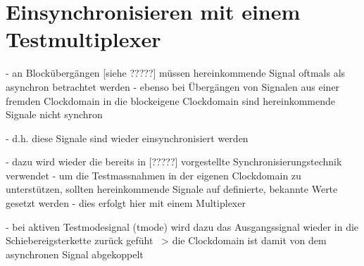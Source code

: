\section{Einsynchronisieren mit einem Testmultiplexer} \label{part-3:SIWTM}

- an Blockübergängen [siehe ?????] müssen hereinkommende Signal oftmals als asynchron betrachtet werden
- ebenso bei Übergängen von Signalen aus einer fremden Clockdomain in die blockeigene Clockdomain sind hereinkommende Signale nicht synchron

- d.h. diese Signale sind wieder einsynchronisiert werden



- dazu wird wieder die bereits in [?????] vorgestellte Synchronisierungstechnik verwendet
- um die Testmassnahmen in der eigenen Clockdomain zu unterstützen, sollten hereinkommende Signale auf definierte, bekannte Werte gesetzt werden
- dies erfolgt hier mit einem Multiplexer



- bei aktiven Testmodesignal (tmode) wird dazu das Ausgangssignal wieder in die Schiebereigsterkette zurück gefüht
~> die Clockdomain ist damit von dem asynchronen Signal abgekoppelt
\clearpage
